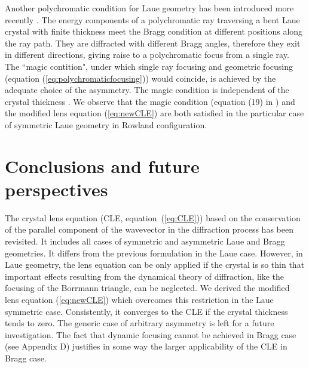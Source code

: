 \documentclass[preprint]{iucr}              %
\begin{document}
Another polychromatic condition for Laue geometry has been introduced more recently \cite{Martinson, PengQi, PengQi2021}.
The energy components of a polychromatic ray traversing a bent Laue crystal with finite thickness meet the Bragg condition at different positions along the ray path. They are diffracted with different Bragg angles, therefore they exit in different directions, giving raise to a polychromatic focus from a single ray. The ``magic contition", under which single ray focusing and geometric focusing (equation (\ref{eq:polychromaticfocusing})) would coincide, is achieved by the adequate choice of the asymmetry. The magic condition is independent of the crystal thickness \cite{PengQi2021}. We observe that the magic condition (equation (19) in \cite{PengQi2021}) and the modified lens equation (\ref{eq:newCLE}) are both satisfied in the particular case of symmetric Laue geometry in Rowland configuration.   

\section{Conclusions and future perspectives}
\label{sec:summary}

The crystal lens equation (CLE, equation~(\ref{eq:CLE})) based on the conservation of the parallel component of the wavevector in the diffraction process has been revisited. It includes all cases of symmetric and asymmetric Laue and Bragg geometries. It differs from the previous formulation \cite{CK} in the Laue case. However, in Laue geometry, the lens equation 
can be only applied if the crystal is so thin that important effects resulting from the dynamical theory of diffraction, like the focusing of the Borrmann triangle, can be neglected. We derived the modified lens equation (\ref{eq:newCLE}) which overcomes this restriction in the Laue symmetric case. Consistently, it converges to the CLE if the crystal thickness tends to zero. The generic case of arbitrary asymmetry is left for a future investigation.
The fact that dynamic focusing cannot be achieved in Bragg case (see Appendix D) justifies in some way the larger applicability of the CLE in Bragg case.
\end{document}
